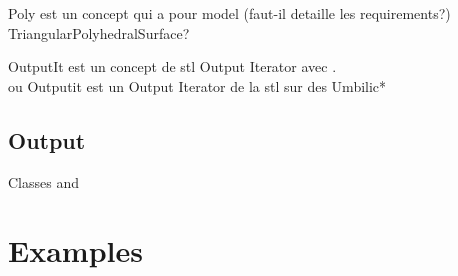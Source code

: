 Poly est un concept qui a pour model  (faut-il
detaille les requirements?) TriangularPolyhedralSurface?

OutputIt est un concept de stl Output Iterator avec  .\\
ou Outputit est un Output Iterator de la stl sur des Umbilic*


\subsection{Output}

Classes  and 

\section{Examples} 
